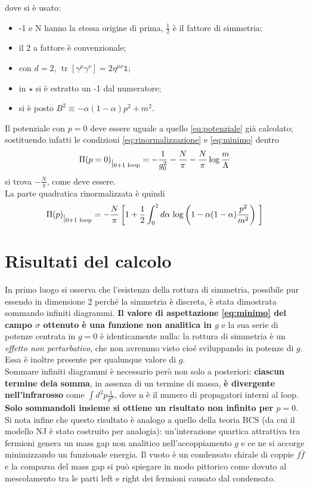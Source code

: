 \documentclass[a4paper,11pt]{amsart}
\newcommand{\nl}{\vskip 0.3cm}
\newcommand{\np}{\vskip 1.3cm}
\newcommand{\ssection}[2]{\section{ \texorpdfstring{\textbf{#1}}{#2} }}
\DeclareMathOperator{\tr}{tr}
\begin{document}
dove si è usato:
\begin{itemize}
 \item -1 e N hanno la stessa origine di prima, $\frac{1}{2}$ è il fattore di simmetria;
 \item il 2 a fattore è convenzionale;
 \item con $d=2$, $\tr\left[\gamma^{\mu}\gamma^{\nu}\right] = 2 \eta^{\mu\nu} \mathbb{1}$;
 \item in $\star$ si è estratto un -1 dal numeratore;
 \item si è posto $ B^2 \equiv -\alpha (1 - \alpha ) p^2 + m^2 $. 
\end{itemize}
\nl

Il potenziale con $p=0$ deve essere uguale a quello \eqref{eq:potenziale} già calcolato; sostituendo infatti le condizioni \eqref{eq:rinormalizzazione} e \eqref{eq:minimo} dentro
\[\Pi(p=0)\raisebox{-0.15cm}{$|_{\text{0+1 loop}}$} = -\frac{1}{g_0^2} -\frac{N}{\pi} - \frac{N}{\pi}\log \frac{m}{\Lambda}\] si trova $- \frac{N}{\pi}$, come deve essere.\\
La parte quadratica rinormalizzata è quindi
\begin{equation}
 \Pi(p)\raisebox{-0.15cm}{$|_{\text{0+1 loop}}$} = -\frac{N}{\pi}\left[1+\frac{1}{2}\int_0^1 d\alpha\, \log \left( 1 - \alpha (1 - \alpha ) \frac{p^2}{m^2} \right)\ \right]
 \label{eq:quadratica}
\end{equation}
\np

\ssection{Risultati del calcolo}{Risultati}
In primo luogo si osserva che l'esistenza della rottura di simmetria, possibile pur essendo in dimensione 2 perché la simmetria è discreta, è stata dimostrata sommando infiniti diagrammi. \textbf{Il valore di aspettazione \ref{eq:minimo} del campo $\sigma$ ottenuto è una funzione non analitica in $g$ }e la sua serie di potenze centrata in $g=0$ è identicamente nulla: la rottura di simmetria è un \emph{effetto non perturbativo}, che non avremmo visto cioé sviluppando in potenze di $g$. Essa è inoltre presente per qualunque valore di $g$.\\
Sommare infiniti diagrammi è necessario però non solo a posteriori: \textbf{ciascun termine dela somma}, in assenza di un termine di massa, \textbf{è divergente nell'infrarosso} come $\int d^2p \frac{1}{p^n}$, dove n è il numero di propagatori interni al loop. \textbf{Solo sommandoli insieme si ottiene un risultato non infinito per $p=0$}. \\
Si nota infine che questo risultato è analogo a quello della teoria BCS (da cui il modello NJ è stato costruito per analogia): un'interazione quartica attrattiva tra fermioni genera un mass gap non analitico nell'accoppiamento $g$ e ce ne si accorge minimizzando un funzionale energia. Il vuoto è un condensato chirale di coppie $f\bar{f}$ e la comparsa del mass gap si può spiegare in modo pittorico come dovuto al mescolamento tra le parti left e right dei fermioni causato dal condensato.
\nl
\end{document}
